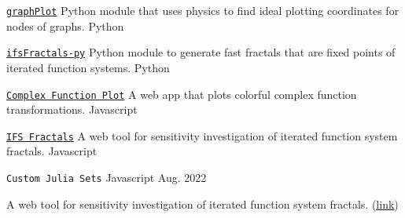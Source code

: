 



\begin{cventries}



  \cventrylightthree
  {\href{https://peterefrancis.com/graphPlot}{\texttt{graphPlot}}}
  {Python module that uses physics to find ideal plotting coordinates for nodes of graphs.}
  {Python}

  \cventrylightthree
  {\href{https://peterefrancis.com/ifsFractals-py}{\texttt{ifsFractals-py}}}
  {Python module to generate fast fractals that are fixed points of iterated function systems.}
  {Python}


  \cventrylightthree
  {\href{https://peterefrancis.com/complex-function-plot/}{\texttt{Complex Function Plot}}}
  {A web app that plots colorful complex function transformations.}
  {Javascript}




  \cventrylightthree
  {\href{https://ifs-fractals.pef.app}{\texttt{IFS Fractals}}}
  {A web tool for sensitivity investigation of iterated function system fractals.}
  {Javascript}

  
    \cventrylight
  {\texttt{Custom Julia Sets}}
  {Javascript}
  {Aug. 2022}
  {
    \begin{cvitems}
      \item {A web tool for sensitivity investigation of iterated function system fractals. (\underline{\href{https://peterefrancis.com/custom-julia-sets}{link}})}
    \end{cvitems}
  }




\end{cventries}